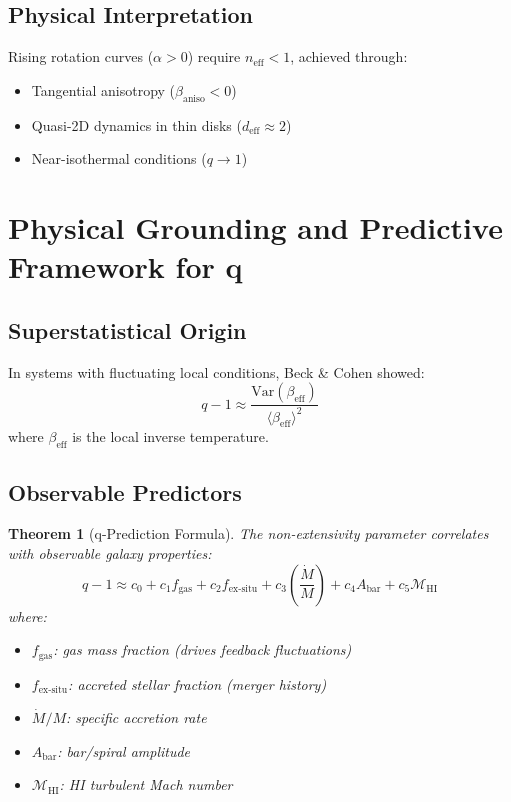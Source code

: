 \documentclass[12pt, a4paper]{article}
\newtheorem{theorem}{Theorem}
\theoremstyle{definition}
\theoremstyle{remark}
\begin{document}
\subsection{Physical Interpretation}

Rising rotation curves ($\alpha > 0$) require $n_{\text{eff}} < 1$, achieved through:
\begin{itemize}
\item Tangential anisotropy ($\beta_{\text{aniso}} < 0$)
\item Quasi-2D dynamics in thin disks ($d_{\text{eff}} \approx 2$)
\item Near-isothermal conditions ($q \to 1$)
\end{itemize}

\section{Physical Grounding and Predictive Framework for q}

\subsection{Superstatistical Origin}

In systems with fluctuating local conditions, Beck \& Cohen \cite{Beck2003} showed:
\begin{equation}
q - 1 \approx \frac{\text{Var}(\beta_{\text{eff}})}{\langle\beta_{\text{eff}}\rangle^2}
\end{equation}
where $\beta_{\text{eff}}$ is the local inverse temperature.

\subsection{Observable Predictors}

\begin{theorem}[q-Prediction Formula]
The non-extensivity parameter correlates with observable galaxy properties:
\begin{equation}
\boxed{q - 1 \approx c_0 + c_1 f_{\text{gas}} + c_2 f_{\text{ex-situ}} + c_3\left(\frac{\dot{M}}{M}\right) + c_4 A_{\text{bar}} + c_5 \mathcal{M}_{\text{HI}}}
\end{equation}
where:
\begin{itemize}
\item $f_{\text{gas}}$: gas mass fraction (drives feedback fluctuations)
\item $f_{\text{ex-situ}}$: accreted stellar fraction (merger history)
\item $\dot{M}/M$: specific accretion rate
\item $A_{\text{bar}}$: bar/spiral amplitude
\item $\mathcal{M}_{\text{HI}}$: HI turbulent Mach number
\end{itemize}
\end{theorem}
\end{document}

